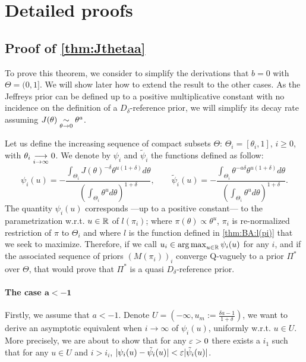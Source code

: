 







\section{Detailed proofs}\label{sec:BA:proofs}


\subsection{Proof of \cref{thm:Jthetaa}}

To prove this theorem, we consider to simplify the derivations that $b=0$ with $\Theta=(0,1]$. We will show later how to extend the result to the other cases. As the Jeffreys prior can be defined up to a positive multiplicative constant with no incidence on the definition of a $D_\delta$-reference prior, 
we will simplify its decay rate assuming $J(\theta)\underset{\theta\rightarrow 0}{\sim}\theta^a$.

Let us define the increasing sequence of compact subsets $\Theta$: $\Theta_i=[\theta_i,1]$, $i\geq0$, with $\theta_i\overset{\ }{\underset{i\rightarrow\infty}{\longrightarrow}}0$. We denote by $\psi_i$ and $\tilde\psi_i$ the functions defined as follow:
    \begin{equation}
        \psi_i(u) = -\frac{\int_{\Theta_i}J(\theta)^{-\delta}\theta^{u(1+\delta)}d\theta }{\left(\int_{\Theta_i}\theta^ud\theta \right)^{1+\delta}},\qquad \tilde\psi_i(u) = -\frac{\int_{\Theta_i}\theta^{-a\delta }\theta^{u(1+\delta)}d\theta }{\left(\int_{\Theta_i}\theta^ud\theta \right)^{1+\delta}}.
    \end{equation}
The quantity $\psi_i(u)$ corresponds ---up to a positive constant--- to the parametrization w.r.t. $u\in\mathbb{R}$ of $l(\pi_i)$; where $\pi(\theta)\propto\theta^u$, $\pi_i$ is re-normalized restriction of $\pi$ to $\Theta_i$  and where $l$ is the function defined in \cref{thm:BA:l(pi)} that we seek to maximize.
Therefore, if we call $u_i\in\operatorname*{arg\,max}_{u\in\mathbb{R}}\psi_i(u)$ for any $i$, and if the associated sequence of priors $(M(\pi_i))_i$ converge Q-vaguely to a prior $\varPi^\ast$ over $\Theta$, that would prove that $\varPi^\ast$ is a quasi $D_\delta$-reference prior.

\paragraph{The case $\mathbf{a<-1}$}
    Firstly, we assume that $a<-1$. Denote $U=(-\infty, u_m:=\frac{\delta a-1}{1+\delta})$, we want to derive an asymptotic equivalent when $i\to\infty$ of $\psi_i(u)$, uniformly w.r.t. $u\in U$.
    More precisely, we are about to show that for any $\varepsilon>0$ there exists a $i_1$ such that for any $u\in U$ and $i>i_i$, $|\psi_i(u)-\tilde\psi_i(u)|<\varepsilon|\tilde\psi_i(u)|$. %
    

